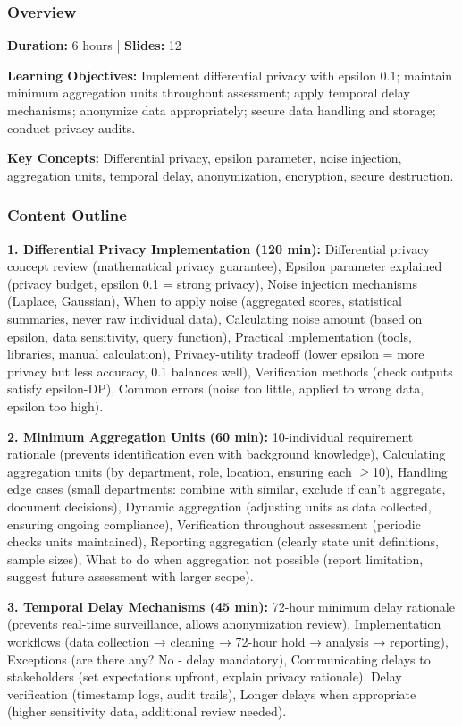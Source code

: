 \documentclass[11pt,a4paper]{article}
\begin{document}
\subsubsection{Overview}
\textbf{Duration:} 6 hours | \textbf{Slides:} 12

\textbf{Learning Objectives:} Implement differential privacy with epsilon 0.1; maintain minimum aggregation units throughout assessment; apply temporal delay mechanisms; anonymize data appropriately; secure data handling and storage; conduct privacy audits.

\textbf{Key Concepts:} Differential privacy, epsilon parameter, noise injection, aggregation units, temporal delay, anonymization, encryption, secure destruction.

\subsubsection{Content Outline}

\textbf{1. Differential Privacy Implementation (120 min):} Differential privacy concept review (mathematical privacy guarantee), Epsilon parameter explained (privacy budget, epsilon 0.1 = strong privacy), Noise injection mechanisms (Laplace, Gaussian), When to apply noise (aggregated scores, statistical summaries, never raw individual data), Calculating noise amount (based on epsilon, data sensitivity, query function), Practical implementation (tools, libraries, manual calculation), Privacy-utility tradeoff (lower epsilon = more privacy but less accuracy, 0.1 balances well), Verification methods (check outputs satisfy epsilon-DP), Common errors (noise too little, applied to wrong data, epsilon too high).

\textbf{2. Minimum Aggregation Units (60 min):} 10-individual requirement rationale (prevents identification even with background knowledge), Calculating aggregation units (by department, role, location, ensuring each $\ge$10), Handling edge cases (small departments: combine with similar, exclude if can't aggregate, document decisions), Dynamic aggregation (adjusting units as data collected, ensuring ongoing compliance), Verification throughout assessment (periodic checks units maintained), Reporting aggregation (clearly state unit definitions, sample sizes), What to do when aggregation not possible (report limitation, suggest future assessment with larger scope).

\textbf{3. Temporal Delay Mechanisms (45 min):} 72-hour minimum delay rationale (prevents real-time surveillance, allows anonymization review), Implementation workflows (data collection → cleaning → 72-hour hold → analysis → reporting), Exceptions (are there any? No - delay mandatory), Communicating delays to stakeholders (set expectations upfront, explain privacy rationale), Delay verification (timestamp logs, audit trails), Longer delays when appropriate (higher sensitivity data, additional review needed).
\end{document}
